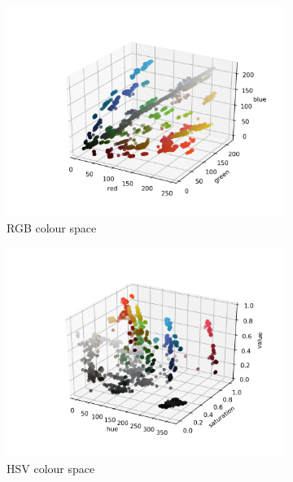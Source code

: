 \documentclass[12pt,a4paper]{article}
\begin{document}
	\begin{center}
		\begin{figure}[H]
			\begin{subfigure}{.5\linewidth}
				\includegraphics[width=\linewidth]{images/rgb.png}
				\caption{RGB colour space}
			\end{subfigure}
			\begin{subfigure}{.5\linewidth}
				\includegraphics[width=\linewidth]{images/hsv.png}
				\caption{HSV colour space}
			\end{subfigure}
			\begin{subfigure}{.5\linewidth}

\end{subfigure}
\end{figure}
\end{center}
\end{document}
